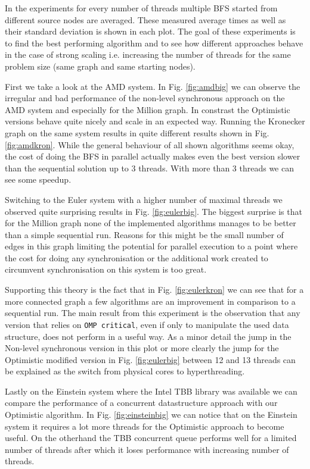 \documentclass[letterpaper]{article}
\begin{document}
		In the experiments for every number of threads multiple BFS started from different source nodes are averaged. 
		These measured average times as well as their standard deviation is shown in each plot.
		The goal of these experiments is to find the best performing algorithm and to see how different approaches behave in the case of strong scaling i.e. increasing the number of threads for the same problem size (same graph and same starting nodes).

		First we take a look at the AMD system.
		In Fig. \ref{fig:amdbig} we can observe the irregular and bad performance of the non-level synchronous approach on the AMD system and especially for the Million graph.
		In constrast the Optimistic versions behave quite nicely and scale in an expected way.
		Running the Kronecker graph on the same system results in quite different results shown in Fig. \ref{fig:amdkron}.
		While the general behaviour of all shown algorithms seems okay, the cost of doing the BFS in parallel actually makes even the best version slower than the sequential solution up to 3 threads.
		With more than 3 threads we can see some speedup. 
		
		Switching to the Euler system with a higher number of maximal threads we observed quite surprising results in Fig. \ref{fig:eulerbig}.
		The biggest surprise is that for the Million graph none of the implemented algorithms manages to be better than a simple sequential run.
		Reasons for this might be the small number of edges in this graph limiting the potential for parallel execution to a point where the cost for doing any synchronisation or the additional work created to circumvent synchronisation on this system is too great.

		Supporting this theory is the fact that in Fig. \ref{fig:eulerkron} we can see that for a more connected graph a few algorithms are an improvement in comparison to a sequential run.
		The main result from this experiment is the observation that any version that relies on \verb+OMP critical+, even if only to manipulate the used data structure, does not perform in a useful way.
		As a minor detail the jump in the Non-level synchronous version in this plot or more clearly the jump for the Optimistic modified version in Fig. \ref{fig:eulerbig} between 12 and 13 threads can be explained as the switch from physical cores to hyperthreading.

		Lastly on the Einstein system where the Intel TBB library was available we can compare the performance of a concurrent datastructure approach with our Optimistic algorithm.
		In Fig. \ref{fig:einsteinbig} we can notice that on the Einstein system it requires a lot more threads for the Optimistic approach to become useful. On the otherhand the TBB concurrent queue performs well for a limited number of threads after which it loses performance with increasing number of threads.
		
\end{document}
